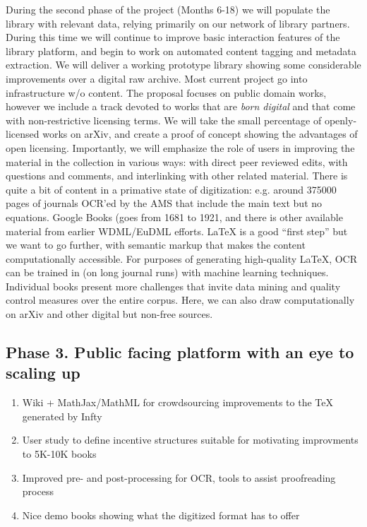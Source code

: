 \documentclass{article}
\begin{document}
During the second phase of the project (Months 6-18) we will populate
the library with relevant data, relying primarily on our network of
library partners.  During this time we will continue to improve basic
interaction features of the library platform, and begin to work on
automated content tagging and metadata extraction.  We will deliver a
working prototype library showing some considerable improvements over
a digital raw archive.  Most current project go into infrastructure w/o content.  The proposal focuses on public domain
works, however we include a track devoted to works that are \emph{born
  digital} and that come with non-restrictive licensing terms.  We will take the small percentage of openly-licensed works on arXiv, and create a proof of concept showing the advantages of open licensing.  Importantly, we will emphasize the role of users in improving the material in the collection in various ways: with direct peer reviewed edits, with questions and comments, and interlinking with other related material.
%
There is quite a bit of content in a primative state of digitization: e.g. around 375000 pages of journals OCR'ed by the AMS that include the main text but no equations.  Google Books (goes from 1681 to 1921, and there is other available material from earlier WDML/EuDML efforts.  LaTeX is a good ``first step'' but we want to go further, with semantic markup that makes the content computationally accessible.  For purposes of generating high-quality LaTeX, OCR can be trained in (on long journal runs) with machine learning techniques.  Individual books present more challenges that invite data mining and quality control measures over the entire corpus.  Here, we can also draw computationally on arXiv and other digital but non-free sources.

\subsection*{Phase 3. Public facing platform with an eye to scaling up}

\begin{enumerate}[label=(\Alph*),itemsep=-5pt]
\item Wiki + MathJax/MathML for crowdsourcing improvements to the TeX generated by Infty
\item User study to define incentive structures suitable for motivating improvments to 5K-10K books
\item Improved pre- and post-processing for OCR, tools to assist proofreading process
\item Nice demo books showing what the digitized format has to offer
\end{enumerate}
\end{document}
